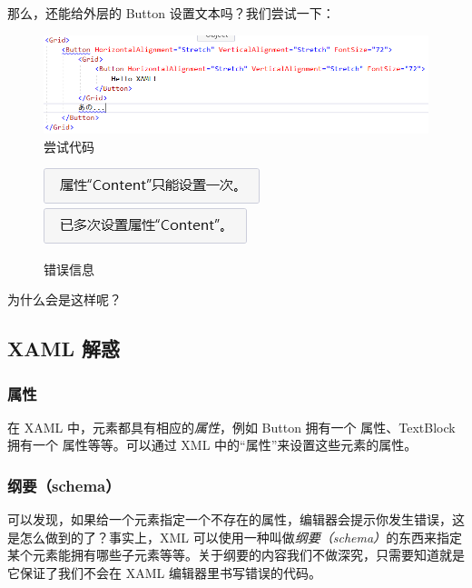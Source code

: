 那么，还能给外层的 Button 设置文本吗？我们尝试一下：
\begin{figure}[htbp]
    \centering
    \includegraphics[width = 0.5\paperwidth]{pic/18.png}
    \caption{尝试代码}
\end{figure}
\begin{figure}[htbp]
    \centering
    \includegraphics[width = 0.3\paperwidth]{pic/19.png}
    \includegraphics[width = 0.3\paperwidth]{pic/20.png}
    \caption{错误信息}
\end{figure}

为什么会是这样呢？

\subsection{XAML 解惑}

\subsubsection{属性}

在 XAML 中，元素都具有相应的\emph{属性}，例如 Button 拥有一个  属性、TextBlock 拥有一个  属性等等。可以通过 XML 中的``属性''来设置这些元素的属性。

\subsubsection{纲要（schema）}

可以发现，如果给一个元素指定一个不存在的属性，编辑器会提示你发生错误，这是怎么做到的了？事实上，XML 可以使用一种叫做\emph{纲要（schema）}的东西来指定某个元素能拥有哪些子元素等等。关于纲要的内容我们不做深究，只需要知道就是它保证了我们不会在 XAML 编辑器里书写错误的代码。

